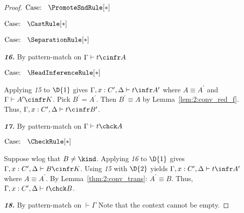 \begin{proof}
    $\text{Case: }\begin{array}{c} \PromoteSndRule[*] \end{array}$
    \begin{proofcase}
    \end{proofcase}

    $\text{Case: }\begin{array}{c} \CastRule[*] \end{array}$
    \begin{proofcase}
    \end{proofcase}

    $\text{Case: }\begin{array}{c} \SeparationRule[*] \end{array}$
    \begin{proofcase}
    \end{proofcase}

    \noindent \textbf{\textit{16.}}
    By pattern-match on $\Gamma \vdash t \cinfr A$

    $\text{Case: }\begin{array}{c} \HeadInferenceRule[*] \end{array}$
    \begin{proofcase}
        Applying \textit{15} to $\D{1}$ gives $\Gamma, x : C^\prime, \Delta \vdash t \infr A^\prime$ where $A \equiv A^\prime$ and $\Gamma \vdash A^\prime \cinfr K$.
        Pick $B^\prime = A^\prime$.
        Then $B^\prime \equiv A$ by Lemma~\ref{lem:2:conv_red_f}.
        Thus, $\Gamma, x : C^\prime, \Delta \vdash t \cinfr B^\prime$.
    \end{proofcase}
    \noindent \textbf{\textit{17.}} By pattern-match on $\Gamma \vdash t \chck A$

    $\text{Case: }\begin{array}{c} \CheckRule[*] \end{array}$
    \begin{proofcase}
        Suppose wlog that $B \neq \kind$.
        Applying \textit{16} to $\D{1}$ gives $\Gamma, x : C^\prime, \Delta \vdash B \cinfr K$.
        Using \textit{15} with $\D{2}$ yields $\Gamma, x : C^\prime, \Delta \vdash t \infr A^\prime$ where $A \equiv A^\prime$.
        By Lemma~\ref{thm:2:conv_trans}: $A^\prime \equiv B$.
        Thus, $\Gamma, x : C^\prime, \Delta \vdash t \chck B$.
    \end{proofcase}
    \noindent \textbf{\textit{18.}} By pattern-match on $\vdash \Gamma$
    Note that the context cannot be empty.


\end{proof}
